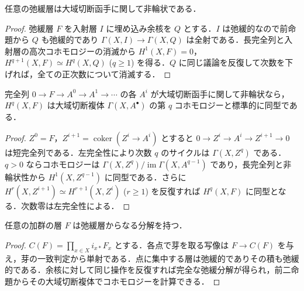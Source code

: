 \begin{prop}[弛緩層の非輪状性]
任意の弛緩層は大域切断函手に関して非輪状である．
\end{prop}
\begin{proof}
弛緩層 $F$ を入射層 $I$ に埋め込み余核を $Q$ とする．$I$ は弛緩的なので前命題から $Q$ も弛緩的であり $\Gamma(X,I)\to\Gamma(X,Q)$ は全射である．長完全列と入射層の高次コホモロジーの消滅から $H^1(X,F)=0$，$H^{q+1}(X,F)\simeq H^q(X,Q)$ ($q\geq1$) を得る．$Q$ に同じ議論を反復して次数を下げれば，全ての正次数について消滅する．
\end{proof}
\begin{prop}[非輪状分解による計算]
完全列 $0\to F\to A^0\to A^1\to\cdots$ の各 $A^i$ が大域切断函手に関して非輪状なら，$H^q(X,F)$ は大域切断複体 $\Gamma(X,A^\bullet)$ の第 $q$ コホモロジーと標準的に同型である．
\end{prop}
\begin{proof}
$Z^0=F$，$Z^{i+1}=\operatorname{coker}(Z^i\to A^i)$ とすると $0\to Z^i\to A^i\to Z^{i+1}\to0$ は短完全列である．左完全性により次数 $q$ のサイクルは $\Gamma(X,Z^q)$ である．$q>0$ ならコホモロジーは $\Gamma(X,Z^q)/\operatorname{im}\Gamma(X,A^{q-1})$ であり，長完全列と非輪状性から $H^1(X,Z^{q-1})$ に同型である．さらに $H^r(X,Z^{i+1})\simeq H^{r+1}(X,Z^i)$ ($r\geq1$) を反復すれば $H^q(X,F)$ に同型となる．次数零は左完全性による．
\end{proof}
\begin{prop}[弛緩分解の存在]
任意の加群の層 $F$ は弛緩層からなる分解を持つ．
\end{prop}
\begin{proof}
$C(F)=\prod_{x\in X}i_{x*}F_x$ とする．各点で芽を取る写像は $F\to C(F)$ を与え，芽の一致判定から単射である．点に集中する層は弛緩的でありその積も弛緩的である．余核に対して同じ操作を反復すれば完全な弛緩分解が得られ，前二命題からその大域切断複体でコホモロジーを計算できる．
\end{proof}
